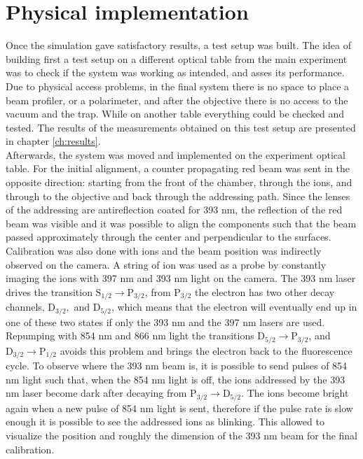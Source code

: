 \section{Physical implementation}
\label{design4}
Once the simulation gave satisfactory results, a test setup was built. The idea of building first a test setup on a different optical table from the main experiment was to check if the system was working as intended, and asses its performance. Due to physical access problems, in the final system there is no space to place a beam profiler, or a polarimeter, and after the objective there is no access to the vacuum and the trap. While on another table everything could be checked and tested. The results of the measurements obtained on this test setup are presented in chapter \ref{ch:results}.\\
Afterwards, the system was moved and implemented on the experiment optical table. For the initial alignment, a counter propagating red beam was sent in the opposite direction: starting from the front of the chamber, through the ions, and through to the objective and back through the addressing path. Since the lenses of the addressing are antireflection coated for 393 nm, the reflection of the red beam was visible and it was possible to align the components such that the beam passed approximately through the center and perpendicular to the surfaces. Calibration was also done with ions and the beam position was indirectly observed on the camera. A string of ion was used as a probe by constantly imaging the ions with 397 nm and 393 nm light on the camera. The 393 nm laser drives the transition $\text{S}_{1/2}\to \text{P}_{3/2}$, from $\text{P}_{3/2}$ the electron has two other decay channels, $\text{D}_{3/2},$ and $\text{D}_{5/2}$, which means that the electron will eventually end up in one of these two states if only the 393 nm and the 397 nm lasers are used. Repumping with 854 nm and 866 nm light the transitions $\text{D}_{5/2}\to \text{P}_{3/2}$, and $\text{D}_{3/2}\to \text{P}_{1/2}$ avoids this problem and brings the electron back to the fluorescence cycle. To observe where the 393 nm beam is, it is possible to send pulses of 854 nm light
such that, when the 854 nm light is off, the ions addressed by the 393 nm laser become dark after decaying from $\text{P}_{3/2}\to  \text{D}_{5/2}$. The ions become bright again when a new pulse of 854 nm light is sent, therefore if the pulse rate is slow enough it is possible to see the addressed ions as blinking. This allowed to visualize the position and roughly the dimension of the 393 nm beam for the final calibration.\\
